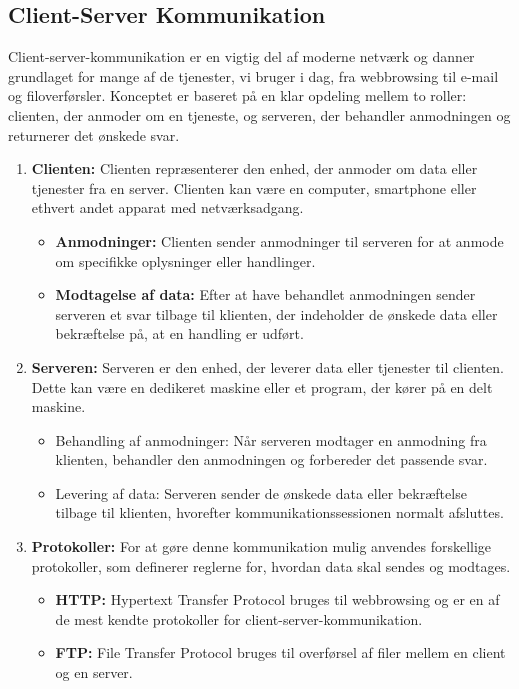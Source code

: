 \subsection{Client-Server Kommunikation}
Client-server-kommunikation er en vigtig del af moderne netværk og danner grundlaget for mange af de tjenester, vi bruger i dag, fra webbrowsing til e-mail og filoverførsler. Konceptet er baseret på en klar opdeling mellem to roller: clienten, der anmoder om en tjeneste, og serveren, der behandler anmodningen og returnerer det ønskede svar.
\begin{enumerate}
	\item \textbf{Clienten:} Clienten repræsenterer den enhed, der anmoder om data eller tjenester fra en server. Clienten kan være en computer, smartphone eller ethvert andet apparat med netværksadgang.
	\begin{itemize}
		\item \textbf{Anmodninger:} Clienten sender anmodninger til serveren for at anmode om specifikke oplysninger eller handlinger.
		\item \textbf{Modtagelse af data:} Efter at have behandlet anmodningen sender serveren et svar tilbage til klienten, der indeholder de ønskede data eller bekræftelse på, at en handling er udført.
	\end{itemize}
	\item \textbf{Serveren:} Serveren er den enhed, der leverer data eller tjenester til clienten. Dette kan være en dedikeret maskine eller et program, der kører på en delt maskine.
	\begin{itemize}
		\item Behandling af anmodninger: Når serveren modtager en anmodning fra klienten, behandler den anmodningen og forbereder det passende svar.
		\item Levering af data: Serveren sender de ønskede data eller bekræftelse tilbage til klienten, hvorefter kommunikationssessionen normalt afsluttes.
	\end{itemize}
	\item \textbf{Protokoller:}	For at gøre denne kommunikation mulig anvendes forskellige protokoller, som definerer reglerne for, hvordan data skal sendes og modtages.
	\begin{itemize}
		\item \textbf{HTTP:} Hypertext Transfer Protocol bruges til webbrowsing og er en af de mest kendte protokoller for client-server-kommunikation.
		\item \textbf{FTP:} File Transfer Protocol bruges til overførsel af filer mellem en client og en server.

\end{itemize}
\end{enumerate}
